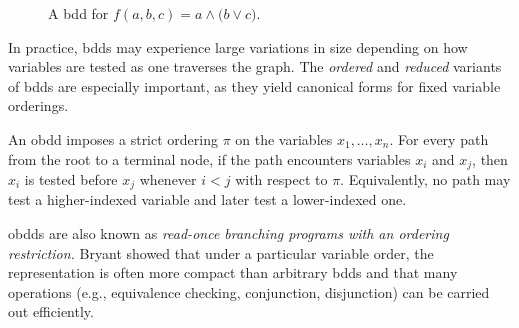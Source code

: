 \begin{figure}[htbp]
\centering
{}
\caption{A \acrfull{bdd} for $f(a,b,c)=a \land \bigl(b \lor c\bigr)$.}
\label{fig:example_bdd}
\end{figure}

In practice, \acrshort{bdd}s may experience large variations in size depending on how variables are tested as one traverses the graph. The \textit{ordered} and \textit{reduced} variants of \acrshort{bdd}s are especially important, as they yield canonical forms for fixed variable orderings.

\begin{definition}
\label{def:obdd}
An \acrfull{obdd} imposes a strict ordering $\pi$ on the variables ${x_1,\dots,x_n}$. For every path from the root to a terminal node, if the path encounters variables $x_i$ and $x_j$, then $x_i$ is tested before $x_j$ whenever $i<j$ with respect to $\pi$. Equivalently, no path may test a higher-indexed variable and later test a lower-indexed one.
\end{definition}

\acrshort{obdd}s are also known as \emph{read-once branching programs with an ordering restriction.} Bryant showed that under a particular variable order, the representation is often more compact than arbitrary \acrshort{bdd}s and that many operations (e.g., equivalence checking, conjunction, disjunction) can be carried out efficiently.

